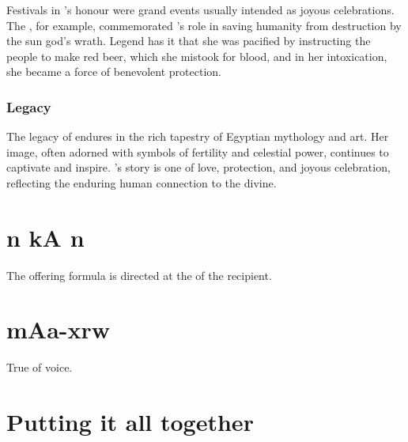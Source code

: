 Festivals in 's honour were grand events usually intended as joyous celebrations. The , for example, commemorated 's role in saving humanity from destruction by the sun god's wrath. Legend has it that she was pacified by  instructing the people to make red beer, which she mistook for blood, and in her intoxication, she became a force of benevolent protection.

\subsubsection*{Legacy}

The legacy of  endures in the rich tapestry of Egyptian mythology and art. Her image, often adorned with symbols of fertility and celestial power, continues to captivate and inspire. 's story is one of love, protection, and joyous celebration, reflecting the enduring human connection to the divine.

\section*{n kA n}

The offering formula is directed at the  of the recipient.

\section*{mAa-xrw}

True of voice.

\section*{Putting it all together}
